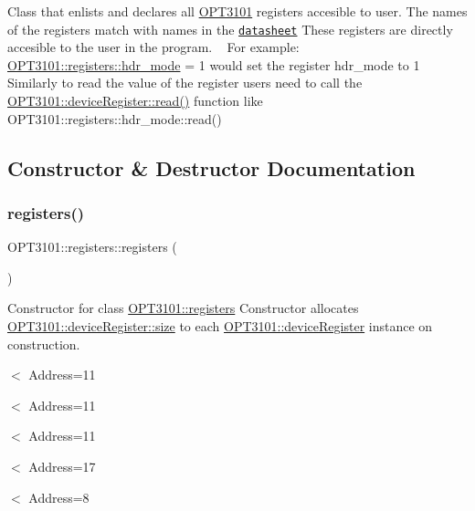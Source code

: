 Class that enlists and declares all \mbox{\hyperlink{namespace_o_p_t3101}{O\+P\+T3101}} registers accesible to user. The names of the registers match with names in the \href{http://www.ti.com/lit/ds/symlink/opt3101.pdf}{\tt datasheet} These registers are directly accesible to the user in the program. ~\newline
 For example\+: \mbox{\hyperlink{class_o_p_t3101_1_1registers_a78e8bc6ad4a84c7d19974ba6c58e329e}{O\+P\+T3101\+::registers\+::hdr\+\_\+mode}} = 1 would set the register hdr\+\_\+mode to 1 ~\newline
 Similarly to read the value of the register users need to call the \mbox{\hyperlink{class_o_p_t3101_1_1device_register_a7092e4906eaff27555bc589eaf737493}{O\+P\+T3101\+::device\+Register\+::read()}} function like O\+P\+T3101\+::registers\+::hdr\+\_\+mode\+::read() 

\subsection{Constructor \& Destructor Documentation}
\mbox{\label{class_o_p_t3101_1_1registers_ad17b048a9eb5a74b3fef29fb145a9e92}} 
\subsubsection{\texorpdfstring{registers()}{registers()}}
{\footnotesize\ttfamily O\+P\+T3101\+::registers\+::registers (\begin{DoxyParamCaption}{ }\end{DoxyParamCaption})}



Constructor for class \mbox{\hyperlink{class_o_p_t3101_1_1registers}{O\+P\+T3101\+::registers}} Constructor allocates \mbox{\hyperlink{class_o_p_t3101_1_1device_register_a058d48b4c23e22739b1c65d85367a0a8}{O\+P\+T3101\+::device\+Register\+::size}} to each \mbox{\hyperlink{class_o_p_t3101_1_1device_register}{O\+P\+T3101\+::device\+Register}} instance on construction. 

$<$ Address=11

$<$ Address=11

$<$ Address=11

$<$ Address=17

$<$ Address=8

